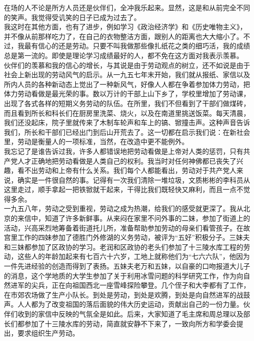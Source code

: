 在场的人不论是所方人员还是伙伴们，全冲我乐起来。显然，这是和从前完全不同的笑声。我觉得受讥笑的日子已成为过去了。\\

我这时在其他方面，也有了进步，例如学习《政治经济学》和《历史唯物主义》，并不像从前那样吃力了，在自己的衣物整洁方面，跟别人的距离也大大缩小了。不过，我最有信心的还是劳动。只要不叫我做那些像扎纸花之类的细巧活，我的成绩总是第一流的。即使是理论学习成绩最好的人，都不免在这方面对我表示羡慕。\\

伙伴们的羡慕和我的信心的增长，与其说是由于劳动观点的树立，还不如说是由于社会上新出现的劳动风气的启示。从一九五七年末开始，我们就从报纸、家信以及所内人员的各种新动态上觉出了一种新风气，好像人人都在争着参加体力劳动，把体力劳动看做是最光荣的事。数以万计的干部上山下乡了，学校里增加了劳动课，出现了各式各样的短期义务劳动的队伍。在所里，我们不但看到了干部们做煤砖，而且看到所长和科长们在厨房里洗菜、烧火，以及在南道里挑送饭菜。每天清晨，我们还没起床，院子里就传来了木制车轮声和车上的镐、锨撞击声。这种声音告诉我们，所长和干部们已经出门到后山开荒去了。这一切都在启示我们说：在新社会里，劳动是衡量人的一项标准，当然，在改造中更不能例外。\\

我忘记了是谁告诉过我，许多人都错误地把劳动看做是上帝对人类的惩罚，只有共产党人才正确地把劳动看做是人类自己的权利。我当时对任何神佛都已丧失了兴趣，看不出劳动和上帝有什么关系。我们每个人都能看出，劳动对于共产党人来说，确实是一件很自然的事。记得有一次我们清除一堆垃圾，文质彬彬的李科员从这里走过，顺手拿起一把铁锨就干起来，干得比我们既轻快又麻利，而且一点不觉得多余。\\

一九五八年，劳动之受到重视，劳动之成为热潮，给我们的感受就更深了。我从北京的来信中，知道了许多新鲜事。从来闷在家里不问外事的二妹，参加了街道上的活动，兴高采烈地筹备着街道托儿所，准备帮助参加劳动的母亲们看管孩子。在故宫里工作的四妹参加了德胜门外修湖的义务劳动，被评为“五好”积极分子。三妹夫和三妹都参加了区政协的学习。老润和区政协的老头们参加了十三陵水库工程的劳动，这些人的年龄加起来有七百六十六岁，工地上就称他们为“七六六队”，他因为一件先进经验的创造而得到了表扬。五妹夫老万和五妹，以自豪的口吻报道大儿子的消息，这个学地质的大学生参加了关于利用冰雪问题的科学研究工作，作为向自然进军的尖兵，正在向祖国西北一座雪峰探险攀登。几个侄子和大李都有了工作，在市郊农场做了生产小队长。到处是劳动，到处是欢腾，到处是向自然进军的战鼓声。人人都为了改变祖国的落后面貌的伟大历史运动，贡献出自己的一份力量。伙伴们收到的家信中反映的气氛全是如此。后来，大家知道了毛主席和周总理以及部长们都参加了十三陵水库的劳动，简直就安静不下来了，一致向所方和学委会提出，要求组织生产劳动。\\


